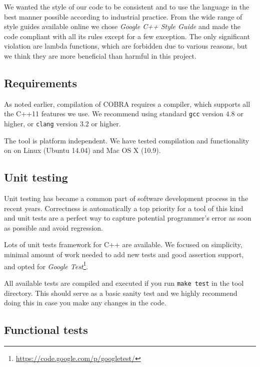 We wanted the style of our code to be consistent and to use
  the language in the best manner possible according to industrial practice.
From the wide range of style guides available online
 we chose \emph{Google C++ Style Guide}\cite{googlestyle} and made
 the code compliant with all its rules except for a few exception.
The only significant violation are lambda functions, which are forbidden
due to various reasons,
 but we think they are more beneficial than harmful in this project.

\subsection{Requirements}
As noted earlier, compilation of COBRA requires a compiler,
  which supports all the C++11 features we use.
We recommend using standard \texttt{gcc} version $4.8$ or higher, or
 \texttt{clang} version $3.2$ or higher.

The tool is platform independent.
  We have tested compilation and functionality on
  on Linux (Ubuntu 14.04) and Mac OS X (10.9).

\subsection{Unit testing}
Unit testing has became a common part of software development process
  in the recent years.
Correctness is automatically a top priority for a tool of this kind and
  unit tests are a perfect way to capture potential programmer's error
  as soon as possible and avoid regression.

Lots of unit tests framework for C++ are available.
We focused on simplicity, minimal amount of work needed to add new tests
  and good assertion support, and opted for
  \emph{Google Test}\footnote{\url{https://code.google.com/p/googletest/}}.

All available tests are compiled and executed if you run \texttt{make test}
  in the tool directory.
This should serve as a basic sanity test and we highly recommend
  doing this in case you make any changes in the code.

\subsection{Functional tests}
